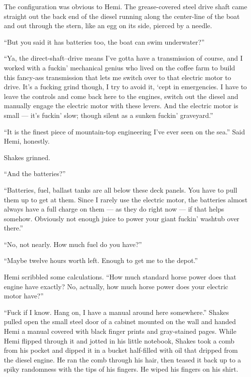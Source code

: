\documentclass[
]{scrbook}
\begin{document}
The configuration was obvious to Hemi. The grease-covered steel drive
shaft came straight out the back end of the diesel running along the
center-line of the boat and out through the stern, like an egg on its
side, pierced by a needle.

``But you said it has batteries too, the boat can swim underwater?''

``Ya, the direct-shaft--drive means I've gotta have a transmission of
course, and I worked with a fuckin' mechanical genius who lived on the
coffee farm to build this fancy-ass transmission that lets me switch
over to that electric motor to drive. It's a fucking grind though, I try
to avoid it, `cept in emergencies. I have to leave the controls and come
back here to the engines, switch out the diesel and manually engage the
electric motor with these levers. And the electric motor is small ---
it's fuckin' slow; though silent as a sunken fuckin' graveyard.''

``It is the finest piece of mountain-top engineering I've ever seen on
the sea.'' Said Hemi, honestly.

Shakes grinned.

``And the batteries?''

``Batteries, fuel, ballast tanks are all below these deck panels. You
have to pull them up to get at them. Since I rarely use the electric
motor, the batteries almost always have a full charge on them --- as
they do right now --- if that helps somehow. Obviously not enough juice
to power your giant fuckin' washtub over there.''

``No, not nearly. How much fuel do you have?''

``Maybe twelve hours worth left. Enough to get me to the depot.''

Hemi scribbled some calculations. ``How much standard horse power does
that engine have exactly? No, actually, how much horse power does your
electric motor have?''

``Fuck if I know. Hang on, I have a manual around here somewhere.''
Shakes pulled open the small steel door of a cabinet mounted on the wall
and handed Hemi a manual covered with black finger prints and
gray-stained pages. While Hemi flipped through it and jotted in his
little notebook, Shakes took a comb from his pocket and dipped it in a
bucket half-filled with oil that dripped from the diesel engine. He ran
the comb through his hair, then teased it back up to a spiky randomness
with the tips of his fingers. He wiped his fingers on his shirt.
\end{document}
